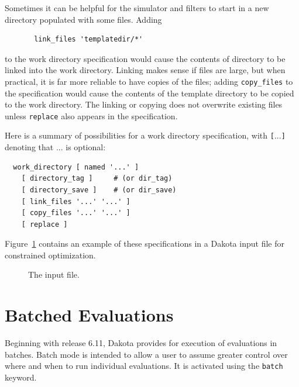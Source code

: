 Sometimes it can be helpful for the simulator and filters to start in a
new directory populated with some files.  Adding
\begin{small}
\begin{verbatim}
       link_files 'templatedir/*'
\end{verbatim}
\end{small}
to the work directory specification would cause the
contents of directory  to be linked
into the work directory.  Linking makes sense if files are large,
but when practical, it is far more reliable to have
copies of the files; adding \texttt{copy\_files} to the specification
would cause the contents of the template directory to be copied
to the work directory.  The linking or copying does
not overwrite existing files unless \texttt{replace} also appears
in the specification.

Here is a summary of possibilities for a work directory specification,
with {\tt\verb=[=$...$\verb=]=} denoting that $...$ is optional:
\begin{small}
\begin{verbatim}
  work_directory [ named '...' ]
    [ directory_tag ]     # (or dir_tag)
    [ directory_save ]    # (or dir_save)
    [ link_files '...' '...' ]
    [ copy_files '...' '...' ]
    [ replace ]
\end{verbatim}
\end{small}

Figure~\ref{fig:interface:workdir} contains an example of these
specifications in a Dakota input file for constrained optimization.
\begin{figure}
  \centering
  \begin{bigbox}
    \begin{small}
    \end{small}
  \end{bigbox}
  \caption{The \protect{} input file.}
  \label{fig:interface:workdir}
\end{figure}

\section{Batched Evaluations}\label{interfaces:batch}

Beginning with release 6.11, Dakota provides for execution of
evaluations in batches. Batch mode is intended to allow a user
to assume greater control over where and when to run individual
evaluations. It is activated using the \texttt{batch} keyword.

